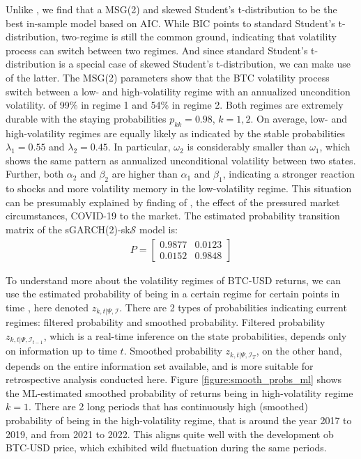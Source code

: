 \documentclass[12pt,a4paper]{article}
\begin{document}
Unlike \cite{ardia2019regime}, we find that a MSG(2) and skewed Student's t-distribution to be the best in-sample model based on AIC. While BIC points to standard Student's t-distribution, two-regime is still the common ground, indicating that volatility process can switch between two regimes. And since standard Student's t-distribution is a special case of skewed Student's t-distribution, we can make use of the latter. The MSG(2) parameters show that the BTC volatility process switch between a low- and high-volatility regime with an annualized uncondition volatility. of 99$\%$ in regime 1 and 54$\%$ in regime 2. Both regimes are extremely durable with the staying probabilities $p_{kk} = 0.98$, $k = 1,2$. On average, low- and high-volatility regimes are equally likely as indicated by the stable probabilities $\lambda_1 = 0.55$ and $\lambda_2 = 0.45$. In particular, $\omega_2$ is considerably smaller than $\omega_1$, which shows the same pattern as annualized unconditional volatility between two states. Further, both $\alpha_2$ and $\beta_2$ are higher than $\alpha_1$ and $\beta_1$, indicating a stronger reaction to shocks and more volatility memory in the low-volatility regime. This situation can be presumably explained by finding of \cite{haas2004new}, the effect of the pressured market circumstances, COVID-19 to the market. The estimated probability transition matrix of the sGARCH(2)-sk$\mathcal{S}$ model is:
\begin{align}
P = \begin{bmatrix} 0.9877 & 0.0123 \\ 0.0152 & 0.9848 \end{bmatrix}
\end{align}

To understand more about the volatility regimes of BTC-USD returns, we can use the estimated probability of being in a certain regime for certain points in time \citep{guidolin2018essentials}, here denoted $z_{k,t\vert \Psi , \mathcal{I}}$. There are 2 types of probabilities indicating current regimes: filtered probability and smoothed probability. Filtered probability $z_{k,t\vert \Psi , \mathcal{I}_{t-1}}$, which is a real-time inference on the state probabilities, depends only on information up to time $t$. Smoothed probability $z_{k,t\vert \Psi , \mathcal{I}_{T}}$, on the other hand, depends on the entire information set available, and is more suitable for retrospective analysis conducted here. Figure \ref{figure:smooth_probs_ml} shows the ML-estimated smoothed probability of returns being in high-volatility regime $k = 1$. There are 2 long periods that has continuously high (smoothed) probability of being in the high-volatility regime, that is around the year 2017 to 2019, and from 2021 to 2022. This aligns quite well with the development ob BTC-USD price, which exhibited wild fluctuation during the same periods.
\end{document}
